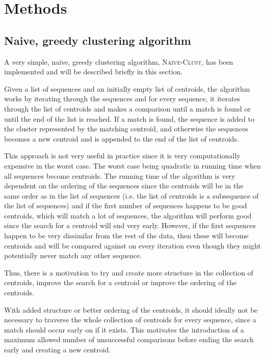 \section{Methods} \label{sec:methods}





\subsection{Naive, greedy clustering algorithm}

A very simple, naive, greedy clustering algorithm, \textsc{Naive-Clust}, has
been implemented and will be described briefly in this section.

Given a list of sequences and an initially empty list of centroids, the
algorithm works by iterating through the sequences and for every sequence, it
iterates through the list of centroids and makes a comparison until a match is
found or until the end of the list is reached. If a match is found, the
sequence is added to the cluster represented by the matching centroid, and
otherwise the sequences becomes a new centroid and is appended to the end of
the list of centroids.

This approach is not very useful in practice since it is very computationally
expensive in the worst case. The worst case being quadratic in running time
when all sequences become centroids. The running time of the algorithm is very
dependent on the ordering of the sequences since the centroids will be in the
same order as in the list of sequences (i.e. the list of centroids is a
subsequence of the list of sequences) and if the first number of sequences
happens to be good centroids, which will match a lot of sequences, the
algorithm will perform good since the search for a centroid will end very
early. However, if the first sequences happen to be very dissimilar from the
rest of the data, then these will become centroids and will be compared
against on every iteration even though they might potentially never match any
other sequence.

Thus, there is a motivation to try and create more structure in the collection
of centroids, improve the search for a centroid or improve the ordering of the
centroids.

With added structure or better ordering of the centroids, it should ideally not
be necessary to traverse the whole collection of centroids for every sequence,
since a match should occur early on if it exists. This motivates the
introduction of a maximum allowed number of unsuccessful comparisons before
ending the search early and creating a new centroid.


